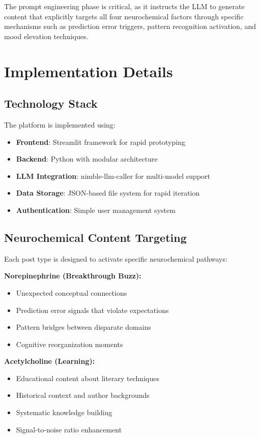 \documentclass{article}
\begin{document}
The prompt engineering phase is critical, as it instructs the LLM to generate content that explicitly targets all four neurochemical factors through specific mechanisms such as prediction error triggers, pattern recognition activation, and mood elevation techniques.

\section{Implementation Details}

\subsection{Technology Stack}

The platform is implemented using:
\begin{itemize}
    \item \textbf{Frontend}: Streamlit framework for rapid prototyping
    \item \textbf{Backend}: Python with modular architecture
    \item \textbf{LLM Integration}: nimble-llm-caller for multi-model support
    \item \textbf{Data Storage}: JSON-based file system for rapid iteration
    \item \textbf{Authentication}: Simple user management system
\end{itemize}

\subsection{Neurochemical Content Targeting}

Each post type is designed to activate specific neurochemical pathways:

\textbf{Norepinephrine (Breakthrough Buzz):}
\begin{itemize}
    \item Unexpected conceptual connections
    \item Prediction error signals that violate expectations
    \item Pattern bridges between disparate domains
    \item Cognitive reorganization moments
\end{itemize}

\textbf{Acetylcholine (Learning):}
\begin{itemize}
    \item Educational content about literary techniques
    \item Historical context and author backgrounds
    \item Systematic knowledge building
    \item Signal-to-noise ratio enhancement
\end{itemize}
\end{document}
